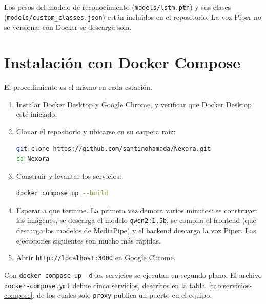 Los pesos del modelo de reconocimiento (\texttt{models/lstm.pth}) y sus clases (\texttt{models/custom\_classes.json}) están incluidos en el repositorio. La voz Piper no se versiona: con Docker se descarga sola.

\section{Instalación con Docker Compose}

El procedimiento es el mismo en cada estación.

\begin{enumerate}
  \item Instalar Docker Desktop y Google Chrome, y verificar que Docker Desktop esté iniciado.
  \item Clonar el repositorio y ubicarse en su carpeta raíz:
\begin{lstlisting}[numbers=none, language=bash]
git clone https://github.com/santinohamada/Nexora.git
cd Nexora
\end{lstlisting}
  \item Construir y levantar los servicios:
\begin{lstlisting}[numbers=none, language=bash]
docker compose up --build
\end{lstlisting}
  \item Esperar a que termine. La primera vez demora varios minutos: se construyen las imágenes, se descarga el modelo \texttt{qwen2:1.5b}, se compila el frontend (que descarga los modelos de MediaPipe) y el backend descarga la voz Piper. Las ejecuciones siguientes son mucho más rápidas.
  \item Abrir \texttt{http://localhost:3000} en Google Chrome.
\end{enumerate}

Con \texttt{docker compose up -d} los servicios se ejecutan en segundo plano. El archivo \texttt{docker-compose.yml} define cinco servicios, descritos en la tabla~\ref{tab:servicios-compose}, de los cuales solo \texttt{proxy} publica un puerto en el equipo.


